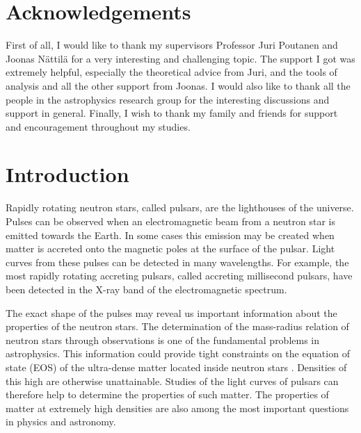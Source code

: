 \documentclass{wihuri}
\begin{document}
\section*{Acknowledgements}
First of all, I would like to thank my supervisors Professor Juri Poutanen and Joonas Nättilä for a very interesting and challenging topic. The support I got was extremely helpful, especially the theoretical advice from Juri, and the tools of analysis and all the other support from Joonas. I would also like to thank all the people in the astrophysics research group for the interesting discussions and support in
general. Finally, I wish to thank my family and friends %
for support and encouragement throughout my studies.
 
\newpage

\tableofcontents %

\newpage





\section*{Introduction}

Rapidly rotating neutron stars, called pulsars, are the lighthouses of the universe. Pulses can be observed when an electromagnetic beam from a neutron star is emitted towards the Earth.  In some cases this emission may be created when matter is accreted onto the magnetic poles at the surface of the pulsar. Light curves from these pulses can be detected in many wavelengths. For example, the most rapidly rotating accreting pulsars, called accreting millisecond pulsars, 
have been detected in the X-ray band of the electromagnetic spectrum. %

The exact shape of the pulses may reveal us important information about the properties of the neutron stars. The determination of the mass-radius relation of neutron stars through observations is one of the fundamental problems in astrophysics. This information could provide tight constraints on the equation of state (EOS) of the ultra-dense matter located inside neutron stars \cite{lattimer2007} \cite{hebeler}. Densities of this high are otherwise unattainable.
Studies of the light curves of pulsars can therefore help to determine the properties of such matter. The properties of matter at extremely high densities are also among the most important questions in physics and astronomy. 
\end{document}
